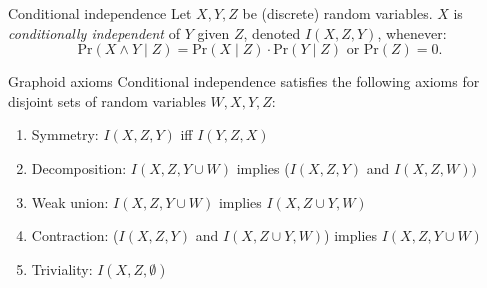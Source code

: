 \documentclass[english]{panikzettel}
\renewcommand{\Pr}{\mathrm{Pr}}
\begin{document}
\begin{defi}{Conditional independence}
    Let $X,Y,Z$ be (discrete) random variables. $X$ is \emph{conditionally independent} of $Y$ given $Z$, denoted $I(X,Z,Y)$, whenever:
    $$\Pr(X \land Y \mid Z)=\Pr(X \mid Z) \cdot \Pr(Y \mid Z) \text{ or } \Pr(Z)=0.$$
\end{defi}

\begin{theo}{Graphoid axioms}
    Conditional independence satisfies the following axioms for disjoint sets of random variables $W,X,Y,Z$:
    \begin{enumerate}
        \item Symmetry: $I(X,Z,Y)$ iff $I(Y,Z,X)$
        \item Decomposition: $I(X,Z,Y \cup W)$ implies ($I(X,Z,Y)$ and $I(X,Z,W))$
        \item Weak union: $I(X,Z,Y \cup W)$ implies $I(X,Z \cup Y,W)$
        \item Contraction: ($I(X,Z,Y)$ and  $I(X,Z \cup Y,W)$) implies $I(X,Z,Y \cup W)$
        \item Triviality: $I(X,Z,\emptyset)$
    \end{enumerate}
\end{theo}
\end{document}
